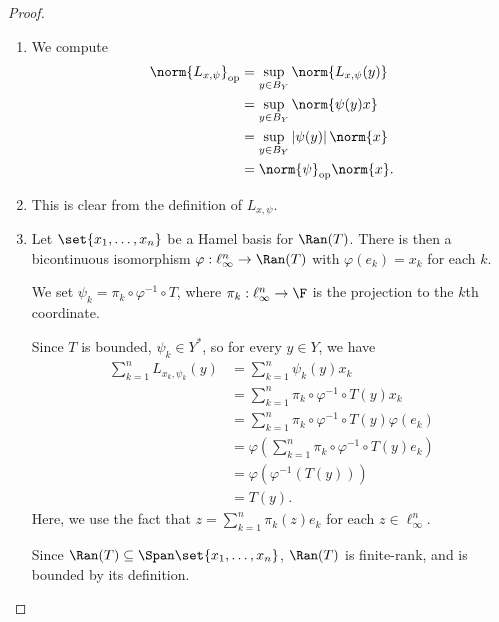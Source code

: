 \documentclass[10pt]{mypackage}
\begin{document}
\begin{proof}\hfill
  \begin{enumerate}[(1)]
    \item We compute
      \begin{align*}
        \norm{L_{x,\psi}}_{\text{op}} &= \sup_{y\in B_Y}\norm{L_{x,\psi}(y)}\\
                                      &= \sup_{y\in B_{Y}}\norm{\psi(y)x}\\
                                      &= \sup_{y\in B_Y}\left\vert \psi(y) \right\vert\norm{x}\\
                                      &= \norm{\psi}_{\text{op}}\norm{x}.
      \end{align*}
    \item This is clear from the definition of $L_{x,\psi}$.
    \item Let $\set{x_1,\dots,x_n}$ be a Hamel basis for $\Ran(T)$. There is then a bicontinuous isomorphism $\varphi: \ell_{\infty}^{n}\rightarrow \Ran(T)$ with $\varphi\left(e_k\right) = x_k$ for each $k$.\newline

      We set $\psi_k = \pi_k\circ\varphi^{-1}\circ T$, where $\pi_{k}: \ell_{\infty}^{n}\rightarrow \F$ is the projection to the $k$th coordinate.\newline

      Since $T$ is bounded, $\psi_{k}\in Y^{\ast}$, so for every $y\in Y$, we have
      \begin{align*}
        \sum_{k=1}^{n}L_{x_k,\psi_k}(y) &= \sum_{k=1}^{n}\psi_k\left(y\right)x_k\\
                                        &= \sum_{k=1}^{n}\pi_k\circ\varphi^{-1}\circ T (y)x_k\\
                                        &= \sum_{k=1}^{n}\pi_k\circ\varphi^{-1}\circ T (y)\varphi\left(e_k\right)\\
                                        &= \varphi\left(\sum_{k=1}^{n}\pi_k\circ\varphi^{-1}\circ T(y)e_k\right)\\
                                        &= \varphi\left(\varphi^{-1}\left(T(y)\right)\right)\\
                                        &= T(y).
      \end{align*}
      Here, we use the fact that $z = \sum_{k=1}^{n}\pi_{k}(z)e_k$ for each $z\in \ell_{\infty}^{n}$.\newline

      Since $\Ran(T)\subseteq \Span\set{x_1,\dots,x_n}$, $\Ran(T)$ is finite-rank, and is bounded by its definition.
  \end{enumerate}
\end{proof}
\end{document}
